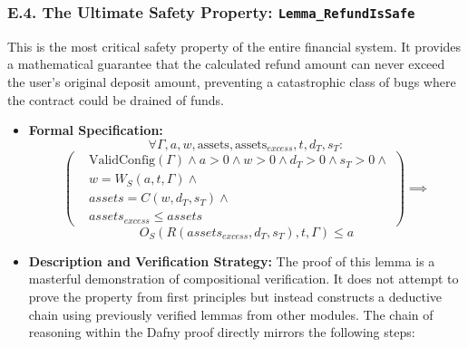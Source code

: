 \documentclass[
  english,
  onecolumn]{article}
\begin{document}
\subsubsection{\texorpdfstring{E.4. The Ultimate Safety Property:
\texttt{Lemma\_RefundIsSafe}}{E.4. The Ultimate Safety Property: Lemma\_RefundIsSafe}}\label{e.4.-the-ultimate-safety-property-lemma_refundissafe}

This is the most critical safety property of the entire financial
system. It provides a mathematical guarantee that the calculated refund
amount can never exceed the user's original deposit amount, preventing a
catastrophic class of bugs where the contract could be drained of funds.

\begin{itemize}
\item
  \textbf{Formal Specification:} \[
  \forall \Gamma, a, w, \text{assets}, \text{assets}_{excess}, t, d_T, s_T :
  \] \[
  (
  \begin{alignedat}{1}
  & \text{ValidConfig}(\Gamma) \land a > 0 \land w > 0 \land d_T > 0 \land s_T > 0 \land \\
  & w = W_S(a, t, \Gamma) \land \\
  & assets = C(w, d_T, s_T) \land \\
  & assets_{excess} \le assets
  \end{alignedat}
  ) \implies
  \] \[
  O_S(R(assets_{excess}, d_T, s_T), t, \Gamma) \le a
  \]
\item
  \textbf{Description and Verification Strategy:} The proof of this
  lemma is a masterful demonstration of compositional verification. It
  does not attempt to prove the property from first principles but
  instead constructs a deductive chain using previously verified lemmas
  from other modules. The chain of reasoning within the Dafny proof
  directly mirrors the following steps:


\end{itemize}
\end{document}
